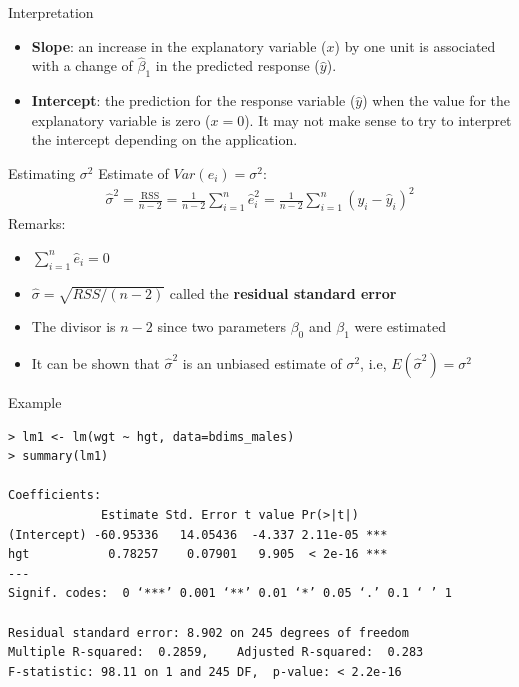 \documentclass[10pt]{beamer}
\begin{document}
\begin{frame}{Interpretation}
\begin{itemize}
\item \textbf{Slope}: an increase in the explanatory variable ($x$) by one unit is associated with a change of $\hat{\beta}_1$ in the predicted response ($\hat{y}$). 
\vspace{10pt}
\item \textbf{Intercept}: the prediction for the response variable ($\hat{y}$) when the value for the explanatory variable is zero ($x=0$).  It may not make sense to try to interpret the intercept depending on the application.    
\end{itemize}
\end{frame}

\begin{frame}{Estimating $\sigma^2$}
Estimate of $Var(e_i) = \sigma^2$:
\begin{align*}
\hat{\sigma}^2 = \frac{\text{RSS}}{n-2} = \frac{1}{n-2} \sum_{i=1}^n \hat{e}_i^2 = \frac{1}{n-2} \sum_{i=1}^n (y_i - \hat{y}_i)^2
\end{align*}
Remarks:
\begin{itemize}
\item $\sum_{i=1}^n \hat{e}_i = 0$ 
\item $\hat{\sigma} = \sqrt{RSS / (n-2)}$ called the \textbf{residual standard error}
\item The divisor is $n-2$ since two parameters $\beta_0$ and $\beta_1$ were estimated
\item It can be shown that $\hat{\sigma}^2$ is an unbiased estimate of $\sigma^2$, i.e, $E(\hat{\sigma}^2) = \sigma^2$
\end{itemize}
\end{frame}

\begin{frame}[fragile]{Example}
\small
\begin{verbatim}
> lm1 <- lm(wgt ~ hgt, data=bdims_males)
> summary(lm1)

Coefficients:
             Estimate Std. Error t value Pr(>|t|)    
(Intercept) -60.95336   14.05436  -4.337 2.11e-05 ***
hgt           0.78257    0.07901   9.905  < 2e-16 ***
---
Signif. codes:  0 ‘***’ 0.001 ‘**’ 0.01 ‘*’ 0.05 ‘.’ 0.1 ‘ ’ 1

Residual standard error: 8.902 on 245 degrees of freedom
Multiple R-squared:  0.2859,	Adjusted R-squared:  0.283 
F-statistic: 98.11 on 1 and 245 DF,  p-value: < 2.2e-16
\end{verbatim}
\end{frame}
\end{document}
